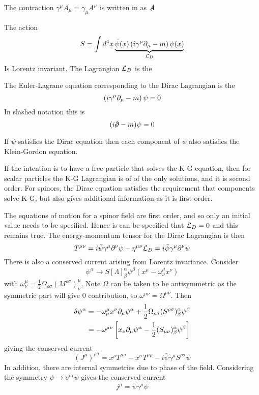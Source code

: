 \documentclass{article}
\begin{document}
\begin{definition}
The contraction $\gamma^\mu A_\mu=\gamma_\mu A^\mu$ is written in  as $\slashed{A}$
\end{definition}

\begin{definition}
The action
\[
S=\int d^{4}x \underbrace{\bar{\psi}(x)\left(i\gamma^\mu\partial_\mu-m\right)\psi(x)}_{\mathcal{L}_D}
\]
Is Lorentz invariant. The Lagrangian $\mathcal{L}_D$ is the 
\end{definition}

\begin{definition}
The Euler-Lagrane equation corresponding to the Dirac Lagrangian is the 
\[
\left(i\gamma^\mu\partial_\mu-m\right)\psi=0
\]
In slashed notation this is 
\[
(i \slashed{\del}-m)\psi=0
\]
\end{definition}

\begin{theorem}
If $\psi$ satisfies the Dirac equation then each component of $\psi$ also satisfies the Klein-Gordon equation. 
\end{theorem}

\begin{idea}
If the intention is to have a free particle that solves the K-G equation, then for scalar particles the K-G Lagrangian is of of the only solutions, and it is second order. For spinors, the Dirac equation satisfies the requirement that components solve K-G, but also gives additional information as it is first order. 
\end{idea}

\begin{example}
The equations of motion for a spinor field are first order, and so only an initial value needs to be specified. Hence is can be specified that $\mathcal{L}_D=0$ and this remains true. 
The energy-momentum tensor for the Dirac Lagrangian is then  
\[
T^{\mu\nu} = i\bar{\psi}\gamma^\mu\partial^\nu\psi-\eta^{\mu\nu}\mathcal{L}_D = i\bar{\psi}\gamma^\mu\partial^\nu\psi
\]
There is also a conserved current arising from Lorentz invariance. Consider 
\[
\psi^\alpha \to S[\Lambda]^\alpha_\beta \psi^\beta (x^\mu-\omega^\mu_\nu x^\nu )
\]
with $\omega^\mu_\nu = \frac{1}{2} \Omega_{\rho\sigma}(M^{\rho\sigma})^\mu_\nu$. Note $\Omega$ can be taken to be antisymmetric as the symmetric part will give $0$ contribution, so $\omega^{\mu\nu}=\Omega^{\mu\nu}$. Then 
\begin{align*}
\delta \psi^\alpha &= -\omega^\mu_\nu x^\nu \partial_\mu \psi^\alpha + \frac{1}{2}\Omega_{\rho\sigma}(S^{\rho\sigma})^\alpha_\beta \psi^\beta \\
&= -\omega^{\mu\nu} \left[ x_\nu \partial_\mu \psi^\alpha -\frac{1}{2} (S_{\mu\nu})^\alpha_\beta \psi^\beta \right]
\end{align*}
giving the conserved current
\[
(J^\mu)^{\rho\sigma}=x^\rho T^{\mu\sigma}-x^\sigma T^{\mu\rho}-i\bar{\psi} \gamma^\mu S^{\rho\sigma} \psi
\]
In addition, there are internal symmetries due to phase of the field. Considering the symmetry $\psi \to e^{i\alpha} \psi$ gives the conserved current 
\[
j^\mu = \bar{\psi} \gamma^\mu \psi
\]
\end{example}
\end{document}
